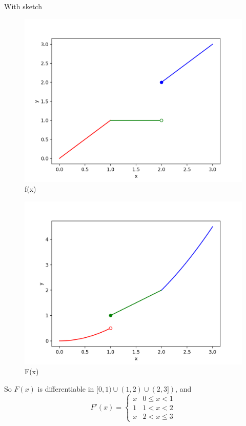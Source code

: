 \documentclass[11pt]{article}
\begin{document}
		With sketch
		\begin{center}
			\begin{figure}[H]
			\includegraphics[width=12cm]{7_3_12_f}
			\caption{f(x)}
			\end{figure}
		\end{center}
		\begin{center}
			\begin{figure}[H]
			\includegraphics[width=12cm]{7_3_12}
			\caption{F(x)}
			\end{figure}
		\end{center}
		
		So $F(x)$ is differentiable in $[0, 1) \cup (1, 2) \cup (2, 3])$, and 
		\[F'(x) = \begin{cases}
			x & 0 \leq x < 1\\
			1 & 1 < x < 2\\
			x & 2 < x \leq 3
		\end{cases}	\]
\end{document}
